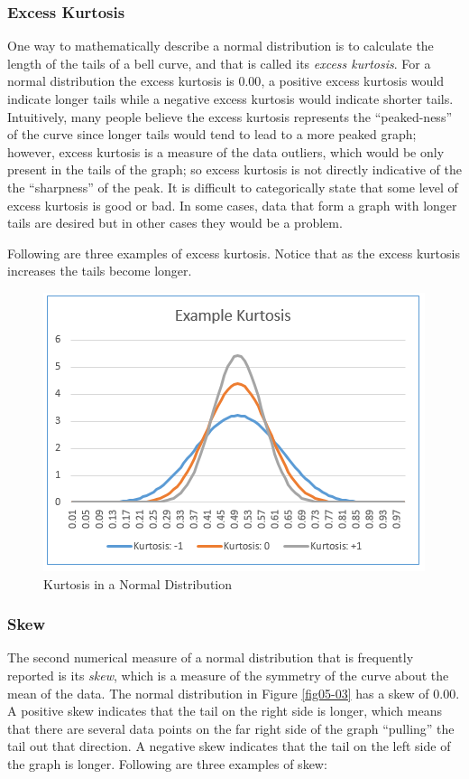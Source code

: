\subsubsection{Excess Kurtosis}
One way to mathematically describe a normal distribution is to calculate the length of the tails of a bell curve, and that is called its \textit{excess kurtosis}. For a normal distribution the excess kurtosis is $ 0.00 $, a positive excess kurtosis would indicate longer tails while a negative excess kurtosis would indicate shorter tails. Intuitively, many people believe the excess kurtosis represents the ``peaked-ness'' of the curve since longer tails would tend to lead to a more peaked graph; however, excess kurtosis is a measure of the data outliers, which would be only present in the tails of the graph; so excess kurtosis is not directly indicative of the the ``sharpness'' of the peak. It is difficult to categorically state that some level of excess kurtosis is good or bad. In some cases, data that form a graph with longer tails are desired but in other cases they would be a problem.

Following are three examples of excess kurtosis. Notice that as the excess kurtosis increases the tails become longer. 

\begin{figure}[H]
	\centering
	\includegraphics[width=\maxwidth{.95\linewidth}]{gfx/05-02}
	\caption{Kurtosis in a Normal Distribution}
	\label{fig05-02}
\end{figure}

\subsubsection{Skew}
The second numerical measure of a normal distribution that is frequently reported is its \textit{skew}, which is a measure of the symmetry of the curve about the mean of the data. The normal distribution in Figure \ref{fig05-03} has a skew of $ 0.00 $. A positive skew indicates that the tail on the right side is longer, which means that there are several data points on the far right side of the graph ``pulling'' the tail out that direction. A negative skew indicates that the tail on the left side of the graph is longer. Following are three examples of skew:

